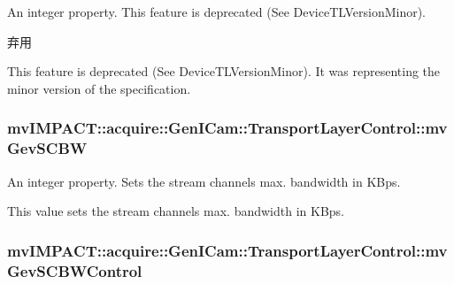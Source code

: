 An integer property. This feature is deprecated (See Device\+T\+L\+Version\+Minor). 

\begin{DoxyRefDesc}{弃用}
\item[\hyperlink{deprecated__deprecated000058}{弃用}]This feature is deprecated (See Device\+T\+L\+Version\+Minor). It was representing the minor version of the specification. \end{DoxyRefDesc}
\hypertarget{classmv_i_m_p_a_c_t_1_1acquire_1_1_gen_i_cam_1_1_transport_layer_control_a683be77efd347acef98e8088311d1cb2}{
\subsubsection[{mv\+Gev\+S\+C\+B\+W}]{ mv\+I\+M\+P\+A\+C\+T\+::acquire\+::\+Gen\+I\+Cam\+::\+Transport\+Layer\+Control\+::mv\+Gev\+S\+C\+B\+W}}\label{classmv_i_m_p_a_c_t_1_1acquire_1_1_gen_i_cam_1_1_transport_layer_control_a683be77efd347acef98e8088311d1cb2}


An integer property. Sets the stream channels max. bandwidth in K\+Bps. 

This value sets the stream channels max. bandwidth in K\+Bps. \hypertarget{classmv_i_m_p_a_c_t_1_1acquire_1_1_gen_i_cam_1_1_transport_layer_control_afd5e25e4bad86b18796ea5897827356f}{
\subsubsection[{mv\+Gev\+S\+C\+B\+W\+Control}]{ mv\+I\+M\+P\+A\+C\+T\+::acquire\+::\+Gen\+I\+Cam\+::\+Transport\+Layer\+Control\+::mv\+Gev\+S\+C\+B\+W\+Control}}\label{classmv_i_m_p_a_c_t_1_1acquire_1_1_gen_i_cam_1_1_transport_layer_control_afd5e25e4bad86b18796ea5897827356f}


